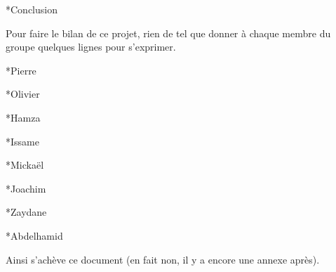 \documentclass[a4paper, 12pt]{report}
\begin{document}
	\begin{chapter}*{Conclusion}
		Pour faire le bilan de ce projet, rien de tel que donner à chaque membre du groupe quelques lignes pour s'exprimer.

		\begin{section}*{Pierre}
		\end{section}

		\begin{section}*{Olivier}
		\end{section}

		\begin{section}*{Hamza}
		\end{section}

		\begin{section}*{Issame}
		\end{section}

		\begin{section}*{Mickaël}
		\end{section}

		\begin{section}*{Joachim}
		\end{section}

		\begin{section}*{Zaydane}
		\end{section}

		\begin{section}*{Abdelhamid}
		\end{section}

		Ainsi s'achève ce document (en fait non, il y a encore une annexe après).\\
	\end{chapter}
\end{document}
